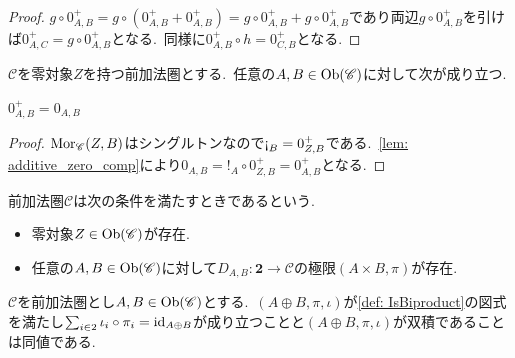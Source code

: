\begin{proof}
$g \circ 0_{A,B}^{+} = g \circ (0_{A,B}^{+} + 0_{A,B}^{+}) = g \circ 0_{A,B}^{+} + g \circ 0_{A,B}^{+}$であり両辺$g \circ 0_{A,B}^{+}$を引けば$0_{A,C}^{+} = g \circ 0_{A,B}^{+}$となる.\
同様に$0_{A,B}^{+} \circ h = 0_{C,B}^{+}$となる.
\end{proof}

\begin{proposition} \label{prop: additive_zero_eq_zero_morphism}
$\mathscr{C}$を零対象$Z$を持つ前加法圏とする.\
任意の$A,B \in \operatorname{Ob}(\mathscr{C})$に対して次が成り立つ.
\begin{center}
    $0_{A,B}^{+} = 0_{A,B}$
\end{center}
\end{proposition}

\begin{proof}
$\operatorname{Mor}_{\mathscr{C}}(Z, B)$はシングルトンなので$\iexcl_B = 0_{Z,B}^{+}$である.\
\cref{lem: additive_zero_comp}により$0_{A,B} = !_A \circ 0_{Z,B}^{+} = 0_{A,B}^{+}$となる.
\end{proof}

\begin{definition} \label{def: IsAdditive}
前加法圏$\mathscr{C}$は次の条件を満たすときであるという.
\begin{itemize}
    \item 零対象$Z \in \operatorname{Ob}(\mathscr{C})$が存在.
    \item 任意の$A, B \in \operatorname{Ob}(\mathscr{C})$に対して$D_{A,B} \colon \mathbf{2} \to \mathscr{C}$の極限$(A \times B, \pi)$が存在.
\end{itemize}
\end{definition}

\begin{proposition} \label{prop: direct_product_and_direct_sum_of_biproduct}
$\mathscr{C}$を前加法圏とし$A, B \in \operatorname{Ob}(\mathscr{C})$とする.\
$(A \oplus B, \pi, \iota)$が\cref{def: IsBiproduct}の図式を満たし$\sum_{i \in 2} \iota_i \circ \pi_i = \operatorname{id}_{A \oplus B}$が成り立つことと$(A \oplus B, \pi, \iota)$が双積であることは同値である.\
\end{proposition}

